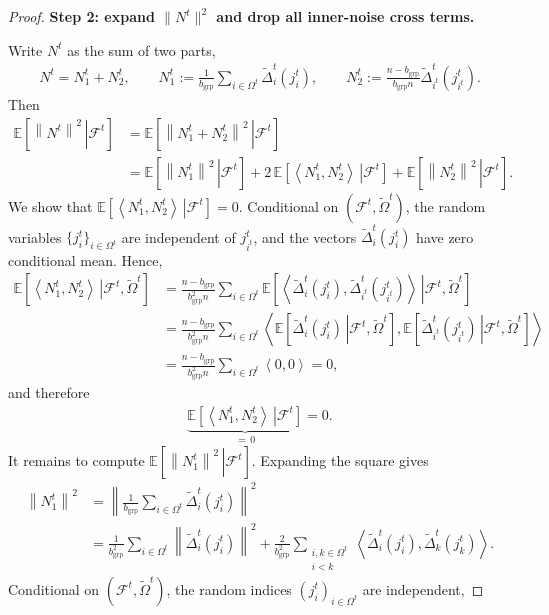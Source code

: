 \documentclass{article}
\newcommand{\inner}[2]{\left\langle #1, #2 \right\rangle}
\newcommand{\sqn}[1]{\left\| #1 \right\|^2}
\newcommand{\eqdef}{:=}
\newcommand{\Expb}[2]{\mathbb{E}\!\left[\left. #1\,\right|#2 \right]}
\newcommand{\Expc}[1]{\Expb{#1}{\mathcal{F}^t}}
\theoremstyle{plain}
\begin{document}
\begin{proof}
\textbf{Step 2: expand $\|N^t\|^2$ and drop all inner-noise cross terms.}

Write $N^t$ as the sum of two parts,
\begin{align*}
N^t = N_1^t + N_2^t,
\qquad
N_1^t \eqdef \frac{1}{b_{\mathrm{grp}}}\sum_{i\in\Omega^t}\widetilde{\Delta}_i^t(j_i^t),
\qquad
N_2^t \eqdef \frac{n-b_{\mathrm{grp}}}{b_{\mathrm{grp}}n}\widetilde{\Delta}_{i^t}^t(j_{i^t}^t).
\end{align*}
Then
\begin{align*}
\Expc{\sqn{N^t}}
&=\Expc{\sqn{N_1^t+N_2^t}} \\
&=\Expc{\sqn{N_1^t}} + 2\,\Expc{\inner{N_1^t}{N_2^t}} + \Expc{\sqn{N_2^t}}.
\end{align*}
We show that $\Expc{\inner{N_1^t}{N_2^t}}=0$. Conditional on $(\mathcal{F}^t,\tilde{\Omega}^t)$,
the random variables $\{j_i^t\}_{i\in\Omega^t}$ are independent of $j_{i^t}^t$, and the vectors
$\widetilde{\Delta}_i^t(j_i^t)$ have zero conditional mean. Hence,
\begin{align*}
\Expb{\inner{N_1^t}{N_2^t}}{\mathcal{F}^t,\tilde{\Omega}^t}
&=\frac{n-b_{\mathrm{grp}}}{b_{\mathrm{grp}}^2n}\sum_{i\in\Omega^t}
\Expb{\inner{\widetilde{\Delta}_i^t(j_i^t)}{\widetilde{\Delta}_{i^t}^t(j_{i^t}^t)}}{\mathcal{F}^t,\tilde{\Omega}^t}\\
&=\frac{n-b_{\mathrm{grp}}}{b_{\mathrm{grp}}^2n}\sum_{i\in\Omega^t}
\inner{\Expb{\widetilde{\Delta}_i^t(j_i^t)}{\mathcal{F}^t,\tilde{\Omega}^t}}{\Expb{\widetilde{\Delta}_{i^t}^t(j_{i^t}^t)}{\mathcal{F}^t,\tilde{\Omega}^t}}\\
&=\frac{n-b_{\mathrm{grp}}}{b_{\mathrm{grp}}^2n}\sum_{i\in\Omega^t}\inner{0}{0}=0,
\end{align*}
and therefore
\begin{align*}
\underbrace{\Expc{\inner{N_1^t}{N_2^t}}}_{=\,0}=0.
\end{align*}
It remains to compute $\Expc{\sqn{N_1^t}}$. Expanding the square gives
\begin{align*}
\sqn{N_1^t}
&=\sqn{\frac{1}{b_{\mathrm{grp}}}\sum_{i\in\Omega^t}\widetilde{\Delta}_i^t(j_i^t)} \\
&=\frac{1}{b_{\mathrm{grp}}^2}\sum_{i\in\Omega^t}\sqn{\widetilde{\Delta}_i^t(j_i^t)}
+\frac{2}{b_{\mathrm{grp}}^2}\sum_{\substack{i,k\in\Omega^t\\ i<k}}
\inner{\widetilde{\Delta}_i^t(j_i^t)}{\widetilde{\Delta}_k^t(j_k^t)}.
\end{align*}
Conditional on $(\mathcal{F}^t,\tilde{\Omega}^t)$, the random indices $(j_i^t)_{i\in\Omega^t}$ are independent,

\end{proof}
\end{document}
